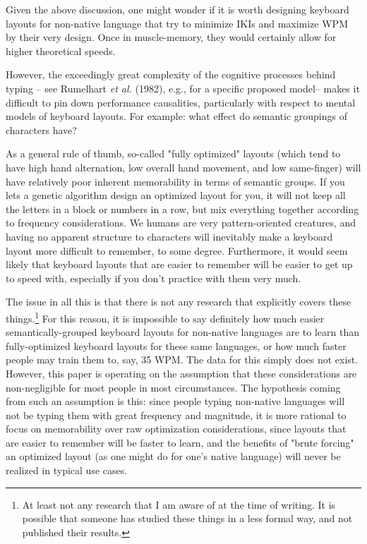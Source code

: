 \documentclass[11pt]{article}
\begin{document}
Given the above discussion, one might wonder if it is worth designing keyboard layouts for non-native language that try to minimize IKIs and maximize WPM by their very design. Once in muscle-memory, they would certainly allow for higher theoretical speeds.

However, the exceedingly great complexity of the cognitive processes behind typing -- see Rumelhart \emph{et al.} (1982), e.g., for a specific proposed model-- makes it difficult to pin down performance causalities, particularly with respect to mental models of keyboard layouts. For example: what effect do semantic groupings of characters have?

As a general rule of thumb, so-called "fully optimized" layouts (which tend to have high hand alternation, low overall hand movement, and low same-finger) will have relatively poor inherent memorability in terms of semantic groups. If you lets a genetic algorithm design an optimized layout for you, it will not keep all the letters in a block or numbers in a row, but mix everything together according to frequency considerations. We humans are very pattern-oriented creatures, and having no apparent structure to characters will inevitably make a keyboard layout more difficult to remember, to some degree. Furthermore, it would seem likely that keyboard layouts that are easier to remember will be easier to get up to speed with, especially if you don't practice with them very much.

The issue in all this is that there is not any research that explicitly covers these things.\footnote{At least not any research that I am aware of at the time of writing. It is possible that someone has studied these things in a less formal way, and not published their results.} For this reason, it is impossible to say definitely how much easier semantically-grouped keyboard layouts for non-native languages are to learn than fully-optimized keyboard layouts for these same languages, or how much faster people may train them to, say, 35 WPM. The data for this simply does not exist. However, this paper is operating on the assumption that these considerations are non-negligible for most people in most circumstances. The hypothesis coming from such an assumption is this: since people typing non-native languages will not be typing them with great frequency and magnitude, it is more rational to focus on memorability over raw optimization considerations, since layouts that are easier to remember will be faster to learn, and the benefits of "brute forcing" an optimized layout (as one might do for one's native language) will never be realized in typical use cases.
\end{document}
